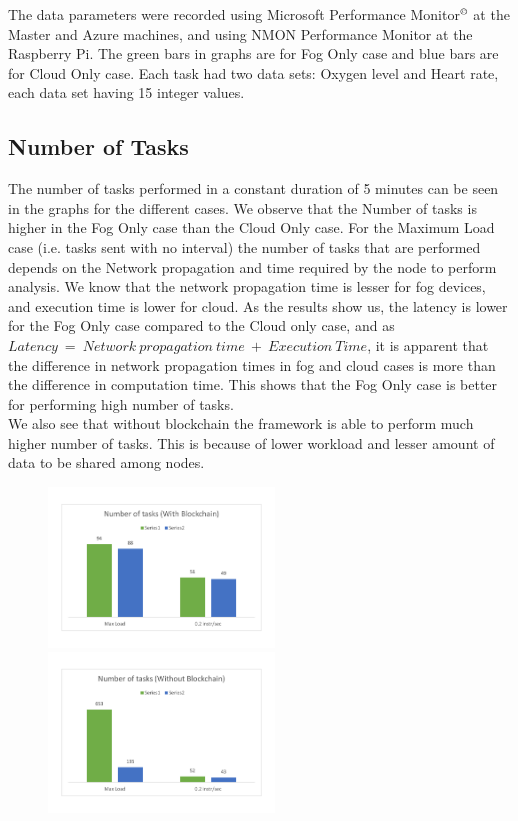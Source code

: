 \documentclass[10pt,journal,compsoc]{IEEEtran}
\begin{document}
The data parameters were recorded using Microsoft Performance Monitor$^\copyright$ at the Master and Azure machines, and using NMON Performance Monitor at the Raspberry Pi. The green bars in graphs are for Fog Only case and blue bars are for Cloud Only case. Each task had two data sets: Oxygen level and Heart rate, each data set having 15 integer values.

\subsection{Number of Tasks}

The number of tasks performed in a constant duration of 5 minutes can be seen in the graphs for the different cases. We observe that the Number of tasks is higher in the Fog Only case than the Cloud Only case. For the Maximum Load case (i.e. tasks sent with no interval) the number of tasks that are performed depends on the Network propagation and time required by the node to perform analysis. We know that the network propagation time is lesser for fog devices, and execution time is lower for cloud. As the results show us, the latency is lower for the Fog Only case compared to the Cloud only case, and as $Latency\ =\ Network\ propagation\ time\ +\ Execution\ Time$, it is apparent that the difference in network propagation times in fog and cloud cases is more than the difference in computation time. This shows that the Fog Only case is better for performing high number of tasks.\\
We also see that without blockchain the framework is able to perform much higher number of tasks. This is because of lower workload and lesser amount of data to be shared among nodes.
\begin{figure}[h]
\centering
\includegraphics[width=6cm]{g11} \ \ \ \ \ \ \ \ \ \ \       
\includegraphics[width=6cm]{g12}
\end{figure}
\end{document}
